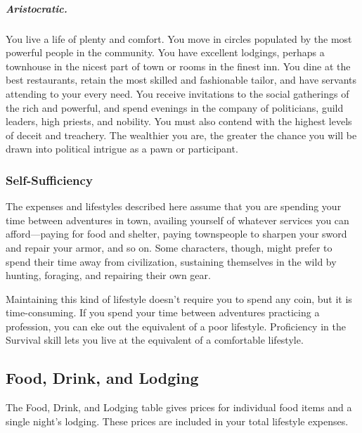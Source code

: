 \subparagraph*{Aristocratic.} You live a life of plenty and comfort. You move in circles populated by the most powerful people in the community. You have excellent lodgings, perhaps a townhouse in the nicest part of town or rooms in the finest inn. You dine at the best restaurants, retain the most skilled and fashionable tailor, and have servants attending to your every need. You receive invitations to the social gatherings of the rich and powerful, and spend evenings in the company of politicians, guild leaders, high priests, and nobility. You must also contend with the highest levels of deceit and treachery. The wealthier you are, the greater the chance you will be drawn into political intrigue as a pawn or participant.

\subsubsection{Self-Sufficiency}

The expenses and lifestyles described here assume that you are spending your time between adventures in town, availing yourself of whatever services you can afford—paying for food and shelter, paying townspeople to sharpen your sword and repair your armor, and so on. Some characters, though, might prefer to spend their time away from civilization, sustaining themselves in the wild by hunting, foraging, and repairing their own gear.

Maintaining this kind of lifestyle doesn't require you to spend any coin, but it is time-consuming. If you spend your time between adventures practicing a profession, you can eke out the equivalent of a poor lifestyle. Proficiency in the Survival skill lets you live at the equivalent of a comfortable lifestyle.

\subsection{Food, Drink, and Lodging}

The Food, Drink, and Lodging table gives prices for individual food items and a single night's lodging. These prices are included in your total lifestyle expenses.

